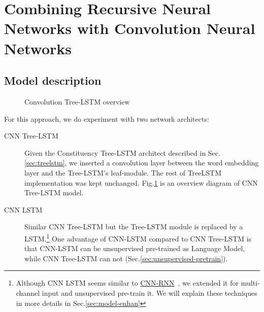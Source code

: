 \hypertarget{sec:CNNtree}{\section{Combining Recursive Neural Networks with Convolution Neural Networks}}\label{sec:CNNtree}
\subsection{Model description}
\begin{figure}[H]
    \centering
    \caption[Convolution Tree-LSTM overview]{Convolution Tree-LSTM overview}
    \label{fig:convtreelstmsummary}
\end{figure}
For this approach, we do experiment with two network architects:
\begin{description}
\item[CNN Tree-LSTM] Given the Constituency Tree-LSTM architect described in Sec.\ref{sec:treelstm},  we inserted a convolution layer between the word embedding layer and the Tree-LSTM's leaf-module.
The rest of TreeLSTM implementation was kept unchanged.
Fig.\ref{fig:convtreelstmsummary} is an overview diagram of CNN Tree-LSTM model.
\item[CNN LSTM] Similar CNN Tree-LSTM but the Tree-LSTM module is replaced by a LSTM.\footnote{Although CNN LSTM seems similar to \hyperref[cnn-rnn]{CNN-RNN}~\cite{cnn-rnn}, we extended it for multi-channel input and unsupervised pre-train it. We will explain these techniques in more details in Sec.\ref{sec:model-enhan}}
One advantage of CNN-LSTM compared to CNN Tree-LSTM is that CNN-LSTM can be unsupervised pre-trained as Language Model, while CNN Tree-LSTM can not (Sec.\ref{sec:unsupervised-pretrain}).
\end{description}

